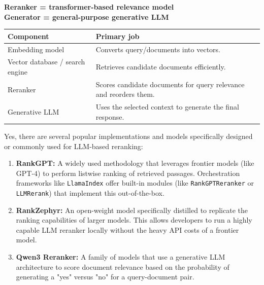 \documentclass[12pt, a4paper]{article}
\begin{document}
\begin{center}
\textbf{Reranker = transformer-based relevance model}\\
\textbf{Generator = general-purpose generative LLM}
\end{center}

\begin{longtable}{p{}p{}}
\toprule
\textbf{Component} & \textbf{Primary job}\\
\midrule
Embedding model & Converts query/documents into vectors.\\
Vector database / search engine & Retrieves candidate documents efficiently.\\
Reranker & Scores candidate documents for query relevance and reorders them.\\
Generative LLM & Uses the selected context to generate the final response.\\
\bottomrule
\end{longtable}

Yes, there are several popular implementations and models specifically designed or commonly used for LLM-based reranking:

\begin{enumerate}
    \item \textbf{RankGPT:} A widely used methodology that leverages frontier models (like GPT-4) to perform listwise ranking of retrieved passages. Orchestration frameworks like \texttt{LlamaIndex} offer built-in modules (like \texttt{RankGPTReranker} or \texttt{LLMRerank}) that implement this out-of-the-box.

    \item \textbf{RankZephyr:} An open-weight model specifically distilled to replicate the ranking capabilities of larger models. This allows developers to run a highly capable LLM reranker locally without the heavy API costs of a frontier model.

    \item \textbf{Qwen3 Reranker:} A family of models that use a generative LLM architecture to score document relevance based on the probability of generating a "yes" versus "no" for a query-document pair.
    
\end{enumerate}
\end{document}
